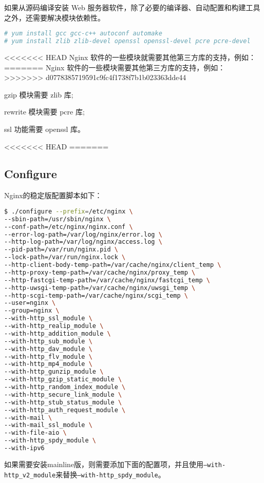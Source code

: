 如果从源码编译安装 Web 服务器软件，除了必要的编译器、自动配置和构建工具之外，还需要解决模块依赖性。


\begin{lstlisting}[language=bash]
# yum install gcc gcc-c++ autoconf automake
# yum install zlib zlib-devel openssl openssl-devel pcre pcre-devel
\end{lstlisting}

<<<<<<< HEAD
Nginx 软件的一些模块就需要其他第三方库的支持，例如：
=======
Nginx 软件的一些模块需要其他第三方库的支持，例如：
>>>>>>> d0778385719591c9fc4f1738f7b1b023363dde44

\begin{compactitem}
\item gzip 模块需要 zlib 库;
\item rewrite 模块需要 pcre 库;
\item ssl 功能需要 openssl 库。
\end{compactitem}

<<<<<<< HEAD
=======

\subsection{Configure}

Nginx的稳定版配置脚本如下：

\begin{lstlisting}[language=bash]
$ ./configure --prefix=/etc/nginx \
--sbin-path=/usr/sbin/nginx \
--conf-path=/etc/nginx/nginx.conf \
--error-log-path=/var/log/nginx/error.log \
--http-log-path=/var/log/nginx/access.log \
--pid-path=/var/run/nginx.pid \
--lock-path=/var/run/nginx.lock \
--http-client-body-temp-path=/var/cache/nginx/client_temp \
--http-proxy-temp-path=/var/cache/nginx/proxy_temp \
--http-fastcgi-temp-path=/var/cache/nginx/fastcgi_temp \
--http-uwsgi-temp-path=/var/cache/nginx/uwsgi_temp \
--http-scgi-temp-path=/var/cache/nginx/scgi_temp \
--user=nginx \
--group=nginx \
--with-http_ssl_module \
--with-http_realip_module \
--with-http_addition_module \
--with-http_sub_module \
--with-http_dav_module \
--with-http_flv_module \
--with-http_mp4_module \
--with-http_gunzip_module \
--with-http_gzip_static_module \
--with-http_random_index_module \
--with-http_secure_link_module \
--with-http_stub_status_module \
--with-http_auth_request_module \
--with-mail \
--with-mail_ssl_module \
--with-file-aio \
--with-http_spdy_module \
--with-ipv6
\end{lstlisting}

如果需要安装mainline版，则需要添加下面的配置项，并且使用\texttt{--with-http\_v2\_module}来替换\texttt{--with-http\_spdy\_module}。

